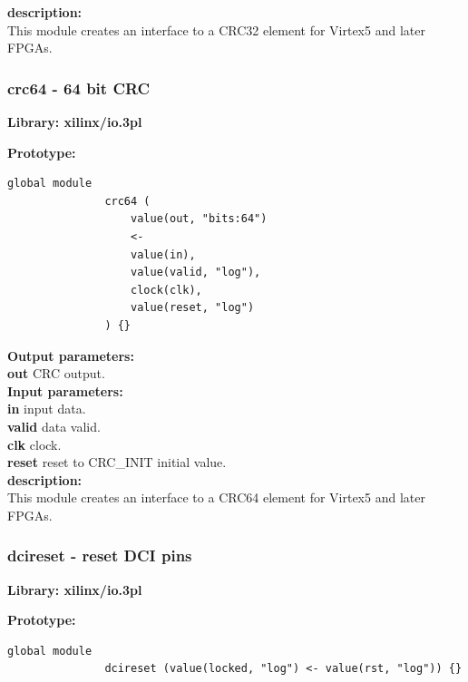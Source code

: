             {\bf description:} \\
            This module creates an interface to a CRC32 element for
            Virtex5 and later FPGAs.




        \subsubsection{crc64 - 64 bit CRC}\label{sec:lmcrc64}

            {\bf Library: xilinx/io.3pl}

            {\bf Prototype:} \\
            \vsp
            \begin{lstlisting}[gobble=12, language=threepl]
               global module
               crc64 (
                   value(out, "bits:64")
                   <-
                   value(in),
                   value(valid, "log"),
                   clock(clk),
                   value(reset, "log")
               ) {}
            \end{lstlisting}

            {\bf Output parameters:} \\
            {\bf out} CRC output.\\


            {\bf Input parameters:} \\
            {\bf in} input data.\\
            {\bf valid} data valid.\\
            {\bf clk} clock.\\
            {\bf reset} reset to CRC\_INIT initial value.\\

            {\bf description:} \\
            This module creates an interface to a CRC64 element for
            Virtex5 and later FPGAs.







        \subsubsection{dcireset - reset DCI pins}\label{sec:lmdcireset}

            {\bf Library: xilinx/io.3pl}

            {\bf Prototype:} \\
            \vsp
            \begin{lstlisting}[gobble=12, language=threepl]
               global module
               dcireset (value(locked, "log") <- value(rst, "log")) {}
            \end{lstlisting}

